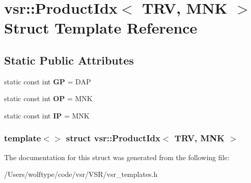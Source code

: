 \hypertarget{structvsr_1_1_product_idx_3_01_t_r_v_00_01_m_n_k_01_4}{\section{vsr\-:\-:Product\-Idx$<$ T\-R\-V, M\-N\-K $>$ Struct Template Reference}
\label{structvsr_1_1_product_idx_3_01_t_r_v_00_01_m_n_k_01_4}
}
\subsection*{Static Public Attributes}
\begin{DoxyCompactItemize}
\item 
\hypertarget{structvsr_1_1_product_idx_3_01_t_r_v_00_01_m_n_k_01_4_a779e70160a64fa65a7f67f15b52b5c6b}{static const int {\bfseries G\-P} = D\-A\-P}\label{structvsr_1_1_product_idx_3_01_t_r_v_00_01_m_n_k_01_4_a779e70160a64fa65a7f67f15b52b5c6b}

\item 
\hypertarget{structvsr_1_1_product_idx_3_01_t_r_v_00_01_m_n_k_01_4_ab7212d2c57f66f93cbeefaad4dc39e04}{static const int {\bfseries O\-P} = M\-N\-K}\label{structvsr_1_1_product_idx_3_01_t_r_v_00_01_m_n_k_01_4_ab7212d2c57f66f93cbeefaad4dc39e04}

\item 
\hypertarget{structvsr_1_1_product_idx_3_01_t_r_v_00_01_m_n_k_01_4_ac3ff09b33fec349bf46b5388d3abb82c}{static const int {\bfseries I\-P} = M\-N\-K}\label{structvsr_1_1_product_idx_3_01_t_r_v_00_01_m_n_k_01_4_ac3ff09b33fec349bf46b5388d3abb82c}

\end{DoxyCompactItemize}
\subsubsection*{template$<$$>$ struct vsr\-::\-Product\-Idx$<$ T\-R\-V, M\-N\-K $>$}



The documentation for this struct was generated from the following file\-:\begin{DoxyCompactItemize}
\item 
/\-Users/wolftype/code/vsr/\-V\-S\-R/vsr\-\_\-templates.\-h\end{DoxyCompactItemize}

